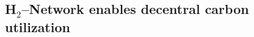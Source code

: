 \documentclass[twocolumn]{article}
\newcommand{\carbon}{CO$_2$}
\newcommand{\CO}{CO$_2$}
\newcommand{\hydrogen}{H$_2$}
\newcommand{\modBase}{Baseline model}
\newcommand{\modCO}{CO$_2$-Grid model}
\begin{document}





\subsection*{\hydrogen{}--Network enables decentral carbon utilization}
\end{document}
